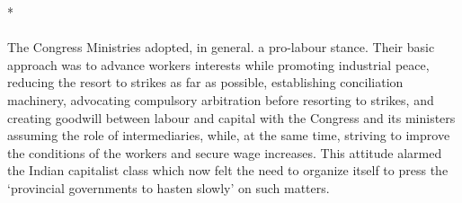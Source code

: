 \begin{multicols}{2}
\begin{center}*\end{center}

\paragraph*{}
The Congress Ministries adopted, in general. a pro-labour stance. Their basic approach was to advance workers interests while promoting industrial peace, reducing the resort to strikes as far as possible, establishing conciliation machinery, advocating compulsory arbitration before resorting to strikes, and creating goodwill between labour and capital with the Congress and its ministers assuming the role of intermediaries, while, at the same time, striving to improve the conditions of the workers and secure wage increases. This attitude alarmed the Indian capitalist class which now felt the need to organize itself to press the `provincial governments to hasten slowly' on such matters.


\end{multicols}
